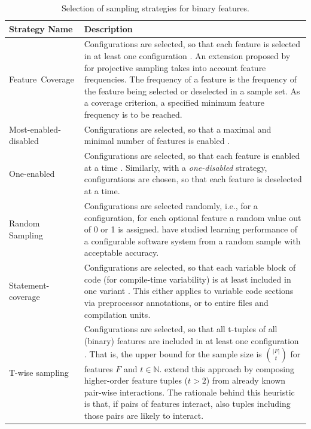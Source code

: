 \begin{table}[h!]
	\centering
	\begin{tabular}{p{}p{}}
	\toprule
	\textbf{Strategy Name} & \textbf{Description} \\
	\midrule
	\mbox{Feature Coverage} & Configurations are selected, so
	that each feature is selected in at least one configuration
  \citep{apel_feature-oriented_2013}. An extension proposed by
  \cite{sarkar_cost-efficient_2015} for projective sampling takes into account
  feature frequencies. The frequency of a feature is the frequency of the
  feature being selected or deselected in a sample set. As a coverage
  criterion, a specified minimum feature frequency is to be reached.\\
  \midrule
  Most-enabled-disabled & Configurations are selected, so that a
  maximal and minimal number of features is enabled
  \citep{medeiros_comparison_2016}. \\
  \midrule
  One-enabled & Configurations are selected, so
  that each feature is enabled at a time \citep{siegmund_predicting_2012}. Similarly, with a
  \emph{one-disabled} strategy, configurations are chosen, so that each feature
  is deselected at a time. \\
  \midrule
  Random Sampling & Configurations are selected randomly, i.e., for a
  configuration, for each optional feature a random value out of 0 or 1 is
  assigned. \cite{guo_variability-aware_2013} have studied learning performance
  of a configurable software system from a random sample with acceptable
  accuracy. \\
  \midrule
  Statement-coverage & Configurations are
  selected, so that each variable block of code (for
  compile-time variability) is at least included in one
  variant \citep{tartler_static_2014}. This either applies to variable code
  sections via preprocessor annotations, or to entire files and compilation
  units. \\
  \midrule
  T-wise sampling & Configurations are selected, so that all
  t-tuples of all (binary) features are included in at least one configuration
  \citep{williams_practical_1996}. That is, the upper bound for the sample size
  is $\binom{|F|}{t}$ for features $F$ and $t \in \mathbb{N}$.
  \cite{siegmund_predicting_2012} extend this approach by composing
  higher-order feature tuples ($t > 2$) from already known pair-wise
  interactions. The rationale behind this heuristic is that, if pairs of
  features interact, also tuples including those pairs are likely to interact.\\
	\bottomrule
	\end{tabular}
	\caption{Selection of sampling strategies for binary features.}
	\label{tab:sampling}
\end{table}

